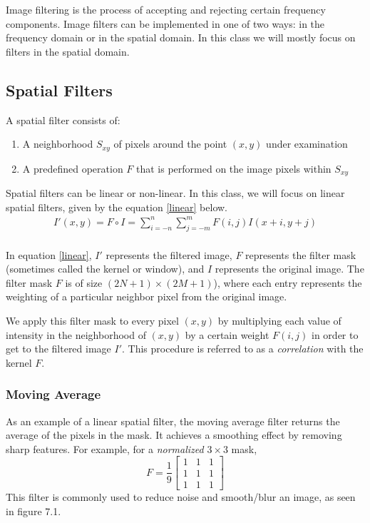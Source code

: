 \documentclass[twoside]{article}
\begin{document}
Image filtering is the process of accepting and rejecting certain frequency components. Image filters can be implemented in one of two ways: in the frequency domain or in the spatial domain. In this class we will mostly focus on filters in the spatial domain.

\subsection{Spatial Filters}
A spatial filter consists of:
\begin{enumerate}
  \item A neighborhood $S_{xy}$ of pixels around the point $(x,y)$ under examination
  \item A predefined operation $F$ that is performed on the image pixels within $S_{xy}$
\end{enumerate}

Spatial filters can be linear or non-linear. In this class, we will focus on linear spatial filters, given by the equation \ref{linear} below.
\begin{equation}
  \label{linear}
  \begin{aligned}
  	I'(x,y) = F \circ I = \sum_{i=-n}^n \sum_{j=-m}^m F(i,j)I(x+i,y+j)\\
  \end{aligned}
\end{equation}

In equation \ref{linear}, $I'$ represents the filtered image, $F$ represents the filter mask (sometimes called the kernel or window), and $I$ represents the original image. The filter mask $F$ is of size $(2N + 1)\times(2M + 1)$), where each entry represents the weighting of a particular neighbor pixel from the original image.

We apply this filter mask to every pixel $(x,y)$ by multiplying each value of intensity in the neighborhood of $(x,y)$ by a certain weight $F(i,j)$ in order to get to the filtered image $I'$. This procedure is referred to as a \textit{correlation} with the kernel $F$.

\subsubsection{Moving Average}
As an example of a linear spatial filter, the moving average filter returns the average of the pixels in the mask. It achieves a smoothing effect by removing sharp features. For example, for a \textit{normalized} $3\times3$ mask,
\[
F = \frac{1}{9}
\begin{bmatrix}
1 & 1 & 1\\
1 & 1 & 1\\
1 & 1 & 1
\end{bmatrix}
\]
This filter is commonly used to reduce noise and smooth/blur an image, as seen in figure 7.1.
\end{document}
